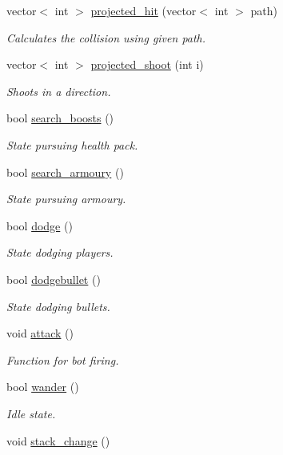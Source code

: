 \begin{DoxyCompactItemize}
\item 
vector$<$ int $>$ \hyperlink{classbots_a15757e21e3d78ad377082898f669b44f}{projected\+\_\+hit} (vector$<$ int $>$ path)
\begin{DoxyCompactList}\small\item\em Calculates the collision using given path. \end{DoxyCompactList}\item 
vector$<$ int $>$ \hyperlink{classbots_a96a90529116ed48c440a236b87e3b4a3}{projected\+\_\+shoot} (int i)
\begin{DoxyCompactList}\small\item\em Shoots in a direction. \end{DoxyCompactList}\item 
bool \hyperlink{classbots_ae97de8f55e8b0fb0608c0c8b732df08f}{search\+\_\+boosts} ()
\begin{DoxyCompactList}\small\item\em State pursuing health pack. \end{DoxyCompactList}\item 
bool \hyperlink{classbots_a723aa0d14cf72f5a6bd87b51cdf05f8f}{search\+\_\+armoury} ()
\begin{DoxyCompactList}\small\item\em State pursuing armoury. \end{DoxyCompactList}\item 
bool \hyperlink{classbots_abbec312aa72dcdd5eae3431dff83f858}{dodge} ()
\begin{DoxyCompactList}\small\item\em State dodging players. \end{DoxyCompactList}\item 
bool \hyperlink{classbots_acfa25d77886914d21946330f569b4afb}{dodgebullet} ()
\begin{DoxyCompactList}\small\item\em State dodging bullets. \end{DoxyCompactList}\item 
\hypertarget{classbots_a5d73e89cf3c8276d9828820ec5dc194f}{void \hyperlink{classbots_a5d73e89cf3c8276d9828820ec5dc194f}{attack} ()}\label{classbots_a5d73e89cf3c8276d9828820ec5dc194f}

\begin{DoxyCompactList}\small\item\em Function for bot firing. \end{DoxyCompactList}\item 
bool \hyperlink{classbots_a1a4ca80cf9182cbcc426ccc784ae7315}{wander} ()
\begin{DoxyCompactList}\small\item\em Idle state. \end{DoxyCompactList}\item 
\hypertarget{classbots_a85969ec33e2c3f6d009a8806ce1f34c1}{void \hyperlink{classbots_a85969ec33e2c3f6d009a8806ce1f34c1}{stack\+\_\+change} ()}\label{classbots_a85969ec33e2c3f6d009a8806ce1f34c1}


\end{DoxyCompactItemize}
